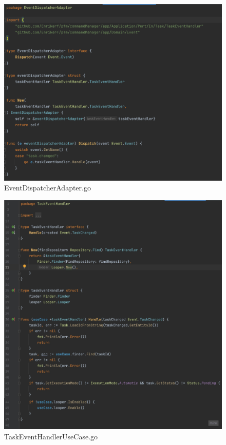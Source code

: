 

\begin{figure}[H]
    \centering
    \includegraphics[height=0.4\textheight]{./part/Ejecucion/Seguimiento/TaskEventHandler/img/PFM - EventDispatcherAdapter}
    \caption{EventDispatcherAdapter.go}\label{fig:EventDispatcherAdapter}
\end{figure}


\begin{figure}[H]
    \centering
    \includegraphics[height=0.4\textheight]{./part/Ejecucion/Seguimiento/TaskEventHandler/img/PFM - TaskEventHandlerUseCase}
    \caption{TaskEventHandlerUseCase.go}\label{fig:TaskEventHandlerUseCase}
\end{figure}


